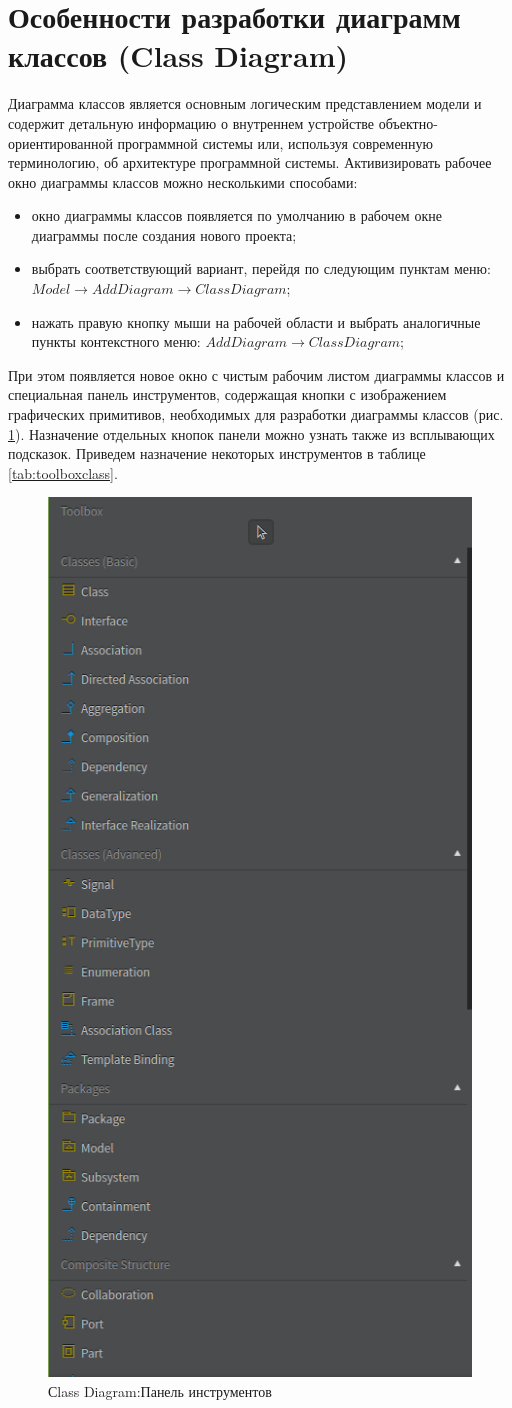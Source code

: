 \documentclass[a4paper,12pt]{report}
\begin{document}
\section{Особенности разработки диаграмм классов (Class Diagram)}
Диаграмма классов является основным логическим представлением модели и содержит детальную информацию о внутреннем устройстве объектно-ориентированной программной системы или, используя современную терминологию, об архитектуре программной системы. Активизировать рабочее окно диаграммы классов можно несколькими способами:
\begin{itemize}
	\item окно диаграммы классов появляется по умолчанию в рабочем окне диаграммы после создания нового проекта;
	\item выбрать соответствующий вариант, перейдя по следующим пунктам меню: \\$Model \to Add Diagram \to Class Diagram$;
	\item нажать правую кнопку мыши на рабочей области и выбрать аналогичные пункты контекстного меню: $Add Diagram \to Class Diagram$;
\end{itemize}

При этом появляется новое окно с чистым рабочим листом диаграммы классов и специальная панель инструментов, содержащая кнопки с изображением графических примитивов, необходимых для разработки диаграммы классов (рис. \ref{fig:toolboxclass}). Назначение отдельных кнопок панели можно узнать также из всплывающих подсказок. Приведем назначение некоторых инструментов в таблице \ref{tab:toolboxclass}.

\begin{figure}[h!]
	\centering
	\includegraphics[width=0.4\linewidth]{images/toolboxclass}
	\caption{Сlass Diagram:Панель инструментов}
	\label{fig:toolboxclass}
\end{figure}
\end{document}
